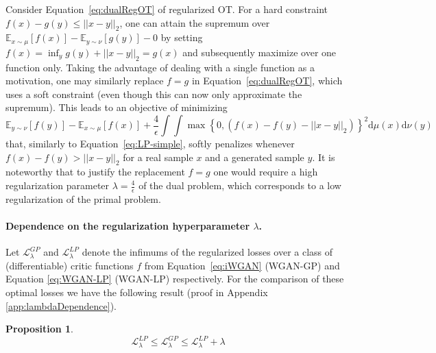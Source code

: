\documentclass{article} %
\newcommand{\norm}[1]{||{#1}||_2}
\newcommand{\af}[1]{\textcolor{blue}{#1}}
\newtheorem{proposition}{Proposition}
\begin{document}
Consider Equation~\eqref{eq:dualRegOT} of regularized OT. For a hard constraint $f(x)-g(y)\leq \norm{x-y}$, one can attain the supremum over $\mathbb{E}_{x\sim \mu}[f(x)] - \mathbb{E}_{y\sim \nu}[g(y)]-0$ by setting $f(x)=\inf_y g(y) + \norm{x-y}=g(x)$ and subsequently maximize over one function only. Taking the advantage of dealing with a single function as a motivation, one may similarly replace $f=g$ in Equation~\ref{eq:dualRegOT}, which uses a soft constraint (even though this can now only approximate the supremum). This leads to an objective of minimizing 
\begin{equation}\label{eq:OPT-L2}
 \mathbb{E}_{y\sim \nu}[f(y)] - \mathbb{E}_{x\sim \mu}[f(x)]+ \frac{4}{\epsilon} \int \int \max \left \{ 0 , \left ( f(x) -f(y) - \norm{x-y}  \right ) \right \}^2 \text{d}\mu(x)\text{d}\nu(y)
\end{equation}
that, similarly to Equation~\eqref{eq:LP-simple}, softly penalizes whenever $f(x)-f(y) > \norm{x-y}$ for a real sample $x$ and  a generated sample $y$. It is noteworthy that to justify the replacement $f=g$ one would require a high regularization parameter $\lambda=\frac{4}{\epsilon}$ of the dual problem, which corresponds to a low regularization of the primal problem.


\paragraph{Dependence on the regularization hyperparameter $\lambda$.}

Let $\mathcal{L}_\lambda^{GP}$ and $\mathcal{L}_\lambda^{LP}$ denote the infimums of the regularized losses over a class of (differentiable) critic functions $f$  from Equation~\eqref{eq:iWGAN} (WGAN-GP) and Equation \eqref{eq:WGAN-LP} (WGAN-LP) respectively. For the comparison of these optimal losses we have the following result (proof in Appendix \ref{app:lambdaDependence}). 

\begin{proposition}\label{prp:lambdaDependence}
$$ \mathcal{L}_\lambda^{LP} \leq  \mathcal{L}_\lambda^{GP} \leq  \mathcal{L}_\lambda^{LP}+\lambda$$
\end{proposition}
\end{document}
